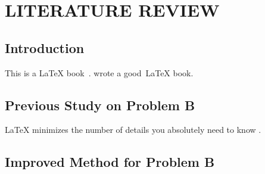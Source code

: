 \chapter{LITERATURE REVIEW}
\label{ch:litreview}

\section{Introduction}

This is a \LaTeX{} book~\citep{urban1986introduction}.  \citet{lamport1994latex} wrote a good~\LaTeX{} book. \cite{Knu86book}

\section{Previous Study on Problem B}

\LaTeX{} minimizes the number of details you absolutely need to know \citep{urban1986introduction,lamport1994latex}.

\section{Improved Method for Problem B}

\lipsum[4-5]